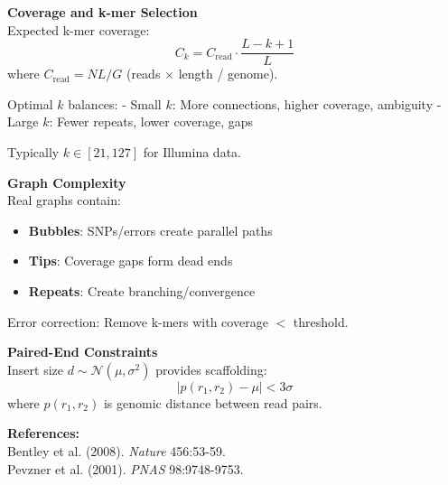 \begin{technical}
\textbf{Coverage and k-mer Selection}\\[0.5em]
Expected k-mer coverage:
\[C_k = C_{\text{read}} \cdot \frac{L-k+1}{L}\]
where $C_{\text{read}} = NL/G$ (reads $\times$ length / genome).

Optimal $k$ balances:
- Small $k$: More connections, higher coverage, ambiguity
- Large $k$: Fewer repeats, lower coverage, gaps

Typically $k \in [21, 127]$ for Illumina data.

\textbf{Graph Complexity}\\[0.5em]
Real graphs contain:
\begin{itemize}[leftmargin=*, topsep=0pt, itemsep=0pt]
\item \textbf{Bubbles}: SNPs/errors create parallel paths
\item \textbf{Tips}: Coverage gaps form dead ends
\item \textbf{Repeats}: Create branching/convergence
\end{itemize}

Error correction: Remove k-mers with coverage $<$ threshold.

\textbf{Paired-End Constraints}\\[0.5em]
Insert size $d \sim \mathcal{N}(\mu, \sigma^2)$ provides scaffolding:
\[|p(r_1, r_2) - \mu| < 3\sigma\]
where $p(r_1, r_2)$ is genomic distance between read pairs.

\vspace{0.5em}
\textbf{References:}\\
{\footnotesize
Bentley et al. (2008). \textit{Nature} 456:53-59.\\
Pevzner et al. (2001). \textit{PNAS} 98:9748-9753.
}
\end{technical}